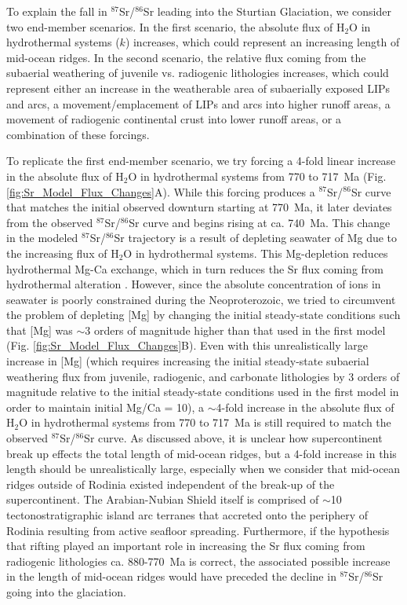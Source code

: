 \documentclass[11pt,letterpaper]{article}
\newcommand{\SrSr}{$^{87}$Sr/$^{86}$Sr\xspace}
\begin{document}
To explain the fall in \SrSr leading into the Sturtian Glaciation, we consider two end-member scenarios. In the first scenario, the absolute flux of H$_{2}$O in hydrothermal systems ($k$) increases, which could represent an increasing length of mid-ocean ridges. In the second scenario, the relative flux coming from the subaerial weathering of juvenile vs. radiogenic lithologies increases, which could represent either an increase in the weatherable area of subaerially exposed LIPs and arcs, a movement/emplacement of LIPs and arcs into higher runoff areas, a movement of radiogenic continental crust into lower runoff areas, or a combination of these forcings.

To replicate the first end-member scenario, we try forcing a 4-fold linear increase in the absolute flux of H$_{2}$O in hydrothermal systems from 770 to 717~Ma (Fig. \ref{fig:Sr_Model_Flux_Changes}A). While this forcing produces a \SrSr curve that matches the initial observed downturn starting at 770~Ma, it later deviates from the observed \SrSr curve and begins rising at ca. 740~Ma. This change in the modeled \SrSr trajectory is a result of depleting seawater of Mg due to the increasing flux of H$_{2}$O in hydrothermal systems. This Mg-depletion reduces hydrothermal Mg-Ca exchange, which in turn reduces the Sr flux coming from hydrothermal alteration \citep{Berndt1988a}. However, since the absolute concentration of ions in seawater is poorly constrained during the Neoproterozoic, we tried to circumvent the problem of depleting [Mg] by changing the initial steady-state conditions such that [Mg] was $\sim$3 orders of magnitude higher than that used in the first model (Fig. \ref{fig:Sr_Model_Flux_Changes}B). Even with this unrealistically large increase in [Mg] (which requires increasing the initial steady-state subaerial weathering flux from juvenile, radiogenic, and carbonate lithologies by 3 orders of magnitude relative to the initial steady-state conditions used in the first model in order to maintain initial Mg/Ca = 10), a $\sim$4-fold increase in the absolute flux of H$_{2}$O in hydrothermal systems from 770 to 717~Ma is still required to match the observed \SrSr curve. As discussed above, it is unclear how supercontinent break up effects the total length of mid-ocean ridges, but a 4-fold increase in this length should be unrealistically large, especially when we consider that mid-ocean ridges outside of Rodinia existed independent of the break-up of the supercontinent. The Arabian-Nubian Shield itself is comprised of $\sim$10 tectonostratigraphic island arc terranes that accreted onto the periphery of Rodinia \citep{Johnson2014a} resulting from active seafloor spreading. Furthermore, if the hypothesis that rifting played an important role in increasing the Sr flux coming from radiogenic lithologies ca. 880-770~Ma is correct, the associated possible increase in the length of mid-ocean ridges would have preceded the decline in \SrSr going into the glaciation.
\end{document}
